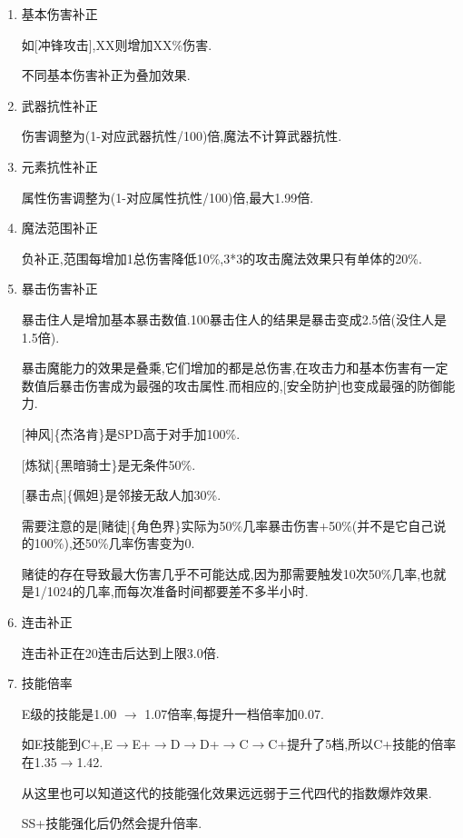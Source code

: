 \begin{enumerate}

	\item 基本伤害补正

	如[冲锋攻击],XX则增加XX\%伤害.

	不同基本伤害补正为叠加效果.

	\item 武器抗性补正

	伤害调整为(1-对应武器抗性/100)倍,魔法不计算武器抗性.

	\item 元素抗性补正
	
	属性伤害调整为(1-对应属性抗性/100)倍,最大1.99倍.

	\item 魔法范围补正
	
	负补正,范围每增加1总伤害降低10\%,3*3的攻击魔法效果只有单体的20\%.

	\item 暴击伤害补正

	暴击住人是增加基本暴击数值.100暴击住人的结果是暴击变成2.5倍(没住人是1.5倍).

	暴击魔能力的效果是叠乘,它们增加的都是总伤害,在攻击力和基本伤害有一定数值后暴击伤害成为最强的攻击属性.而相应的,[安全防护]也变成最强的防御能力.

	[神风]\{杰洛肯\}是SPD高于对手加100\%.

	[炼狱]\{黑暗骑士\}是无条件50\%.

	[暴击点]\{佩妲\}是邻接无敌人加30\%.

	需要注意的是[赌徒]\{角色界\}实际为50\%几率暴击伤害+50\%(并不是它自己说的100\%),还50\%几率伤害变为0.

	赌徒的存在导致最大伤害几乎不可能达成,因为那需要触发10次50\%几率,也就是1/1024的几率,而每次准备时间都要差不多半小时.

	\item 连击补正
	
	连击补正在20连击后达到上限3.0倍.

	\item 技能倍率

	E级的技能是1.00 $\rightarrow$ 1.07倍率,每提升一档倍率加0.07.

	如E技能到C+,E$\rightarrow$E+$\rightarrow$D$\rightarrow$D+$\rightarrow$C$\rightarrow$C+提升了5档,所以C+技能的倍率在1.35$\rightarrow$1.42.

	从这里也可以知道这代的技能强化效果远远弱于三代四代的指数爆炸效果.

	SS+技能强化后仍然会提升倍率.

\end{enumerate}

